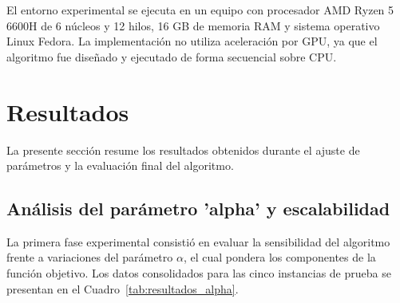 \documentclass[letter, 10pt, dvipdfmx]{article}
\begin{document}
El entorno experimental se ejecuta en un equipo con procesador AMD Ryzen 5 6600H de 6 núcleos y 12 hilos, 16 GB de memoria RAM y sistema operativo Linux Fedora.
La implementación no utiliza aceleración por GPU, ya que el algoritmo fue diseñado y ejecutado de forma secuencial sobre CPU.

\section{Resultados}
La presente sección resume los resultados obtenidos durante el ajuste de parámetros y la evaluación final del algoritmo.

\subsection{Análisis del parámetro 'alpha' y escalabilidad}
La primera fase experimental consistió en evaluar la sensibilidad del algoritmo frente a variaciones del parámetro $\alpha$,
el cual pondera los componentes de la función objetivo. Los datos consolidados para las cinco instancias de prueba se
presentan en el Cuadro~\ref{tab:resultados_alpha}.
\end{document}
